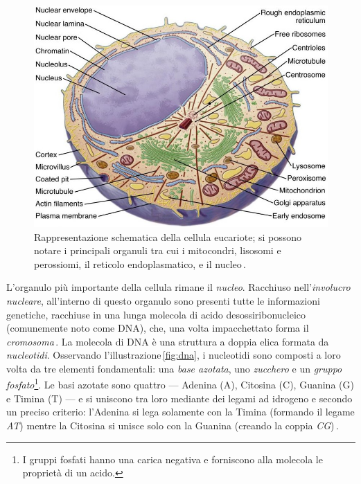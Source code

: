 \begin{figure}[h]
    \centering
    \includegraphics[width=.65\textwidth]{assets/cell.jpg}
    \caption[Rappresentazione schematica della cellula eucariote.]{Rappresentazione schematica della cellula eucariote; si possono notare i principali organuli tra cui i mitocondri, lisosomi e perossiomi, il reticolo endoplasmatico, e il nucleo\,\cite{pollard2022cell}.}\label{fig:cell}
\end{figure}

L'organulo più importante della cellula rimane il \textsl{nucleo}. Racchiuso nell'\textsl{involucro nucleare}, all'interno di questo organulo sono presenti tutte le informazioni genetiche, racchiuse in una lunga molecola di acido desossiribonucleico (comunemente noto come DNA), che, una volta impacchettato forma il \textsl{cromosoma}\,\cite{pollard2022cell, alberts2015essential}. La molecola di DNA è una struttura a doppia elica formata da \textsl{nucleotidi}. Osservando l'illustrazione\,\ref{fig:dna}, i nucleotidi sono composti a loro volta da tre elementi fondamentali: una \textsl{base azotata}, uno \textsl{zucchero} e un \textsl{gruppo fosfato}\footnote{I gruppi fosfati hanno una carica negativa e forniscono alla molecola le proprietà di un acido.}. Le basi azotate sono quattro — Adenina (A), Citosina (C), Guanina (G) e Timina (T) — e si uniscono tra loro mediante dei legami ad idrogeno e secondo un preciso criterio: l'Adenina si lega solamente con la Timina (formando il legame \textit{AT}) mentre la Citosina si unisce solo con la Guanina (creando la coppia \textit{CG})\,\cite{fonseca2000hydrogen, sahu2011identification}. 

